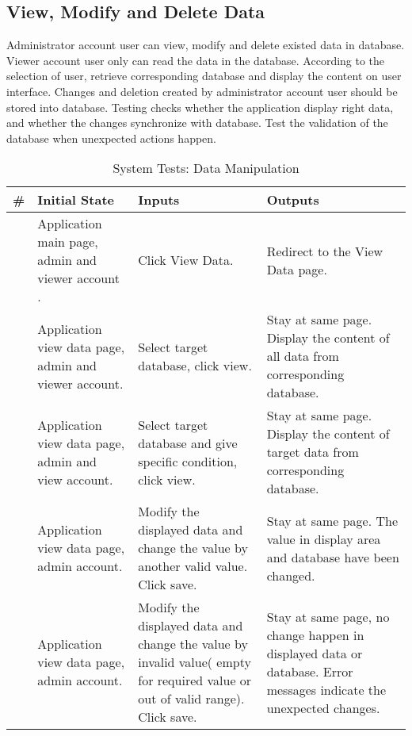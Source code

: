 \documentclass[12pt]{article}
\newcounter{TestCounter}
\begin{document}
\subsection{View, Modify and Delete Data} 
Administrator account user can view, modify and delete existed data in database. Viewer account user only can read the data in the database.  According to the selection of user, retrieve corresponding database and display the content on user interface. Changes and deletion created by administrator account user should be stored into database. Testing checks whether the application display right data, and  whether the changes synchronize with database. Test the validation of the database when unexpected actions happen.
\begin{center}
	\begin{longtable}{c>{\raggedright\arraybackslash}p{4.8cm} >{\raggedright\arraybackslash}p{3cm}>{\raggedright\arraybackslash}p{3cm}}
		\caption{System Tests: Data Manipulation}\label{DataManipulation_SystemTests}\\
		\toprule
		\bf \# & \bf Initial State & \bf Inputs & \bf Outputs \\\midrule
		\stepcounter{TestCounter}\arabic{TestCounter} 
		& Application main page, admin and viewer account .
		& Click View Data.
		& Redirect to the View Data page.
		\\\midrule
		\stepcounter{TestCounter}\arabic{TestCounter} 
		& Application view data page, admin and viewer account.
		& Select target database, click view.
		& Stay at same page. Display the content of all data from corresponding database.
		\\\midrule
		\stepcounter{TestCounter}\arabic{TestCounter} 
		& Application view data page, admin and view account.
		& Select target database and give specific condition, click view. 
		& Stay at same page. Display the content of target data from corresponding database.
		\\\midrule
		\stepcounter{TestCounter}\arabic{TestCounter} 
		& Application view data page, admin account.
		& Modify the displayed data and change the value by another valid value. Click save.
		& Stay at same page. The value in display area and database have been changed.
		\\\midrule
		\stepcounter{TestCounter}\arabic{TestCounter} 
		& Application view data page, admin account.
		& Modify the displayed data and change the value by invalid value( empty for required value or out of valid range). Click save.
		& Stay at same page, no change happen in displayed data or database. Error messages indicate the unexpected changes.

\end{longtable}
\end{center}
\end{document}
